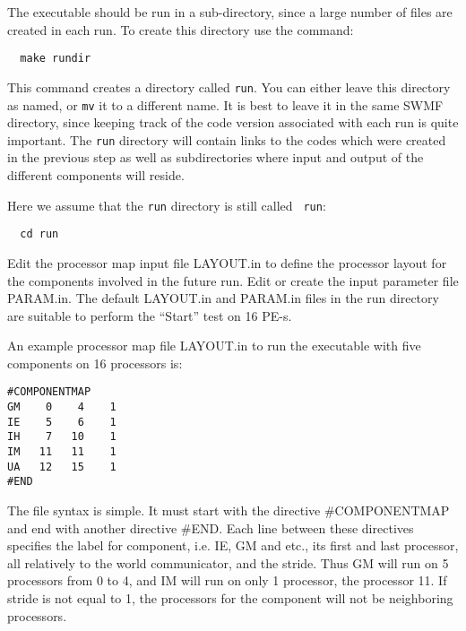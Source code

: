 The executable should be run in a sub-directory, since a large number
of files are created in each run.  To create this directory use the
command:
\begin{verbatim}
  make rundir
\end{verbatim} 
This command creates a directory called {\tt run}.  You can either
leave this directory as named, or {\tt mv} it to a different name.  It
is best to leave it in the same SWMF directory, since
keeping track of the code version associated with each run is quite
important.  The {\tt run} directory will contain links to the codes
which were created in the previous step as well as subdirectories
where input and output of the different components will reside.

Here we assume that the {\tt run} directory is still called {\tt
run}:
\begin{verbatim}
  cd run
\end{verbatim} 
Edit the processor map input file LAYOUT.in to define the processor
layout for the components involved in the future run.  Edit or create
the input parameter file PARAM.in.  The default LAYOUT.in and PARAM.in
files in the run directory are suitable to perform the ``Start'' test
on 16 PE-s. 

An example processor map file LAYOUT.in to run the executable with
five components on 16 processors is:
\begin{verbatim}
#COMPONENTMAP
GM    0    4    1
IE    5    6    1
IH    7   10    1
IM   11   11    1
UA   12   15    1
#END
\end{verbatim}
The file syntax is simple. It must start with the directive
\#COMPONENTMAP and end with another directive \#END. Each line between
these directives specifies the label for component, i.e. IE, GM and
etc., its first and last processor, all relatively to the world
communicator, and the stride. Thus GM will run on 5 processors from 0
to 4, and IM will run on only 1 processor, the processor 11.  If
stride is not equal to 1, the processors for the component will not be
neighboring processors.

